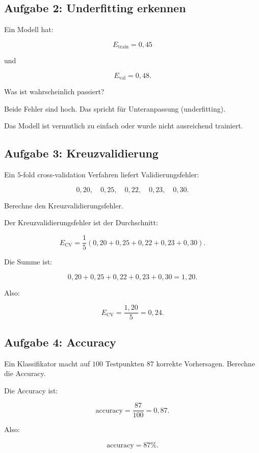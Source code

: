 \subsection{Aufgabe 2: Underfitting erkennen}

Ein Modell hat:

\[
    E_{\mathrm{train}} = 0{,}45
\]

und

\[
    E_{\mathrm{val}} = 0{,}48.
\]

Was ist wahrscheinlich passiert?

\begin{examplebox}
Beide Fehler sind hoch.
Das spricht für Unteranpassung (underfitting).

Das Modell ist vermutlich zu einfach oder wurde nicht ausreichend trainiert.
\end{examplebox}

\subsection{Aufgabe 3: Kreuzvalidierung}

Ein \(5\)-fold cross-validation Verfahren liefert Validierungsfehler:

\[
    0{,}20,
    \quad
    0{,}25,
    \quad
    0{,}22,
    \quad
    0{,}23,
    \quad
    0{,}30.
\]

Berechne den Kreuzvalidierungsfehler.

\begin{examplebox}
Der Kreuzvalidierungsfehler ist der Durchschnitt:

\[
    E_{\mathrm{CV}}
    =
    \frac{1}{5}
    (0{,}20+0{,}25+0{,}22+0{,}23+0{,}30).
\]

Die Summe ist:

\[
    0{,}20+0{,}25+0{,}22+0{,}23+0{,}30
    =
    1{,}20.
\]

Also:

\[
    E_{\mathrm{CV}}
    =
    \frac{1{,}20}{5}
    =
    0{,}24.
\]
\end{examplebox}

\subsection{Aufgabe 4: Accuracy}

Ein Klassifikator macht auf \(100\) Testpunkten \(87\) korrekte Vorhersagen.
Berechne die Accuracy.

\begin{examplebox}
Die Accuracy ist:

\[
    \mathrm{accuracy}
    =
    \frac{87}{100}
    =
    0{,}87.
\]

Also:

\[
    \mathrm{accuracy}
    =
    87\%.
\]
\end{examplebox}

